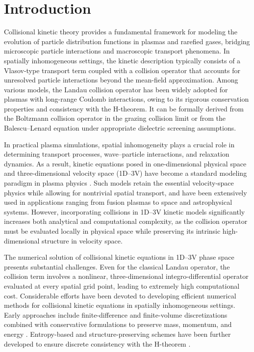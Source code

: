 \documentclass[preprint,1p,times]{elsarticle}
\theoremstyle{definition}
\theoremstyle{remark}
\begin{document}
\section{Introduction}

Collisional kinetic theory provides a fundamental framework for modeling the evolution of particle distribution functions in plasmas and rarefied gases, bridging microscopic particle interactions and macroscopic transport phenomena. 
In spatially inhomogeneous settings, the kinetic description typically consists of a Vlasov-type transport term coupled with a collision operator that accounts for unresolved particle interactions beyond the mean-field approximation. 
Among various models, the Landau collision operator \cite{landau1937kinetic} has been widely adopted for plasmas with long-range Coulomb interactions, owing to its rigorous conservation properties and consistency with the H-theorem. 
It can be formally derived from the Boltzmann collision operator \cite{boltzmann1872weitere, wild1951boltzmann} in the grazing collision limit or from the Balescu–Lenard equation \cite{lenard1960bogoliubov, balescu1960irreversible} under appropriate dielectric screening assumptions.

In practical plasma simulations, spatial inhomogeneity plays a crucial role in determining transport processes, wave–particle interactions, and relaxation dynamics. 
As a result, kinetic equations posed in one-dimensional physical space and three-dimensional velocity space (1D–3V) have become a standard modeling paradigm in plasma physics \cite{cheng1976integration}. 
Such models retain the essential velocity-space physics while allowing for nontrivial spatial transport, and have been extensively used in applications ranging from fusion plasmas to space and astrophysical systems. 
However, incorporating collisions in 1D–3V kinetic models significantly increases both analytical and computational complexity, as the collision operator must be evaluated locally in physical space while preserving its intrinsic high-dimensional structure in velocity space.

The numerical solution of collisional kinetic equations in 1D–3V phase space presents substantial challenges. Even for the classical Landau operator, the collision term involves a nonlinear, three-dimensional integro-differential operator evaluated at every spatial grid point, leading to extremely high computational cost. 
Considerable efforts have been devoted to developing efficient numerical methods for collisional kinetic equations in spatially inhomogeneous settings. 
Early approaches include finite-difference and finite-volume discretizations combined with conservative formulations to preserve mass, momentum, and energy \cite{chang1970practical,larsen1985discretization}. 
Entropy-based and structure-preserving schemes have been further developed to ensure discrete consistency with the H-theorem \cite{buet1999numerical,degond1994entropy}.
\end{document}
